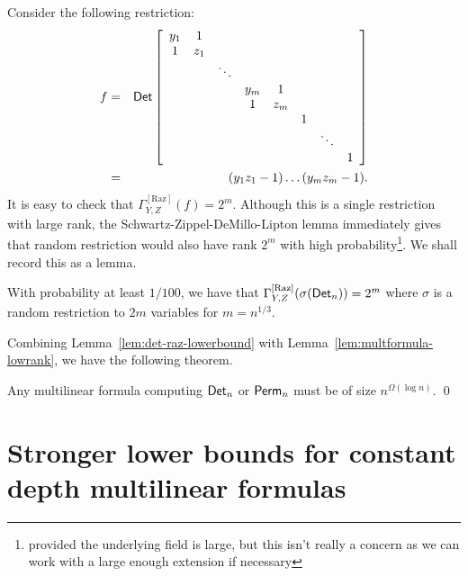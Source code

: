 \documentclass[12pt]{report}
\newcommand{\CM}[1]{\Gamma^{\mathrm{[#1]}}}
\begin{document}
Consider the following restriction:
\begin{eqnarray*}
f & = & \mathsf{Det} \left[ \begin{array}{cccccccc}
y_1 & 1   &        &     &     &  &        &   \\
1   & z_1 &        &     &     &  &        &   \\
    &     & \ddots &     &     &  &        &   \\
    &     &        & y_m &1    &  &        &   \\
    &     &        & 1   &z_m  &  &        &   \\
    &     &        &     &     & 1&        &   \\
    &     &        &     &     &  & \ddots &   \\
    &     &        &     &     &  &        & 1
  \end{array}\right]\\
 &= & (y_1z_1 - 1)\dots (y_mz_m - 1).
\end{eqnarray*}
It is easy to check that $\CM{Raz}_{Y,Z}(f) = 2^m$. Although this is a single restriction with large rank, the Schwartz-Zippel-DeMillo-Lipton lemma immediately gives that random restriction would also have rank $2^m$ with high probability\footnote{provided the underlying field is large, but this isn't really a concern as we can work with a large enough extension if necessary}. We shall record this as a lemma. 

\begin{lemma}\label{lem:det-raz-lowerbound}
With probability at least $1/100$, we have that $\CM{Raz}_{Y,Z}(\sigma(\Det_n)) = 2^m$ where $\sigma$ is a random restriction to $2m$ variables for $m = n^{1/3}$. 
\end{lemma}


Combining Lemma~\ref{lem:det-raz-lowerbound} with Lemma~\ref{lem:multformula-lowrank}, we have the following theorem. 

\begin{theorem} Any multilinear formula computing $\mathsf{Det}_n$ or $\mathsf{Perm}_n$ must be of size $n^{\Omega(\log n)}$. \qed
\end{theorem}


\section{Stronger lower bounds for constant depth multilinear formulas}
\end{document}
